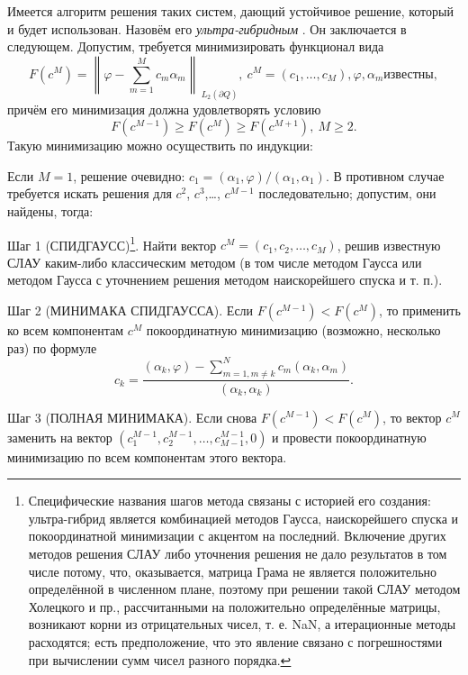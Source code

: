 \documentclass[a4paper, 12pt]{article}
\begin{document}
Имеется алгоритм решения таких систем, дающий устойчивое решение, который и будет использован.
Назовём его {\it ультра-гибридным} .
Он заключается в следующем. Допустим, требуется минимизировать функционал вида
\begin{equation}
  F\left(c^M\right)={\left\|\varphi -\sum^M_{m=1}{c_m}{\alpha }_m\right\|}_{{\ L}_2\left(\partial Q\right)},\ c^M=(c_1,\dots,c_M), \varphi, \alpha_m \text{известны},
\end{equation} 
причём его минимизация должна удовлетворять условию
\begin{equation}F\left(c^{M-1}\right)\ge F\left(c^M\right)\ge F\left(c^{M+1}\right),\ M\ge 2.
\end{equation} 
Такую минимизацию можно осуществить по индукции:

Если $M=1$, решение очевидно: $c_1=\left({\alpha }_1,\varphi \right)/\left({\alpha }_1,{\alpha }_1\right)$. В противном случае требуется искать решения для $c^2$, $c^3$,{\dots}, $c^{M-1}$ последовательно; допустим, они найдены, тогда:

Шаг 1 (СПИДГАУСС)\footnote{ Специфические названия шагов метода связаны с историей его создания: ультра-гибрид является комбинацией методов Гаусса, наискорейшего спуска и покоординатной минимизации с акцентом на последний. Включение других методов решения СЛАУ либо уточнения решения не дало результатов в том числе потому, что, оказывается, матрица Грама не является положительно определённой в численном плане, поэтому при решении такой СЛАУ методом Холецкого и пр., рассчитанными на положительно определённые матрицы, возникают корни из отрицательных чисел, т. е. NaN, а итерационные методы расходятся; есть предположение, что это явление связано с погрешностями при вычислении сумм чисел разного порядка.}.
Найти вектор $c^M=\left(c_1,c_2,\dots ,c_M\right)$, решив известную СЛАУ каким-либо классическим методом (в том числе методом Гаусса или методом Гаусса с уточнением решения методом наискорейшего спуска и т. п.).

Шаг 2 (МИНИМАКА СПИДГАУССА). Если $F\left(c^{M-1}\right)<F\left(c^M\right)$, то применить ко всем компонентам $c^M$ покоординатную минимизацию (возможно, несколько раз) по формуле
\begin{equation}
  c_k=\frac{\left({\alpha }_k,\varphi \right)-\sum^N_{m=1,m\neq k}{c_m}\left({\alpha }_k,{\alpha }_m\right)}{\left({\alpha }_k,{\alpha }_k\right)}.
\end{equation}

Шаг 3 (ПОЛНАЯ МИНИМАКА). Если снова $F\left(c^{M-1}\right)<F\left(c^M\right)$, то вектор $c^M$ заменить на вектор $\left(c^{M-1}_1,c^{M-1}_2,\dots ,c^{M-1}_{M-1},0\right)$ и провести покоординатную минимизацию по всем компонентам этого вектора.
\end{document}
